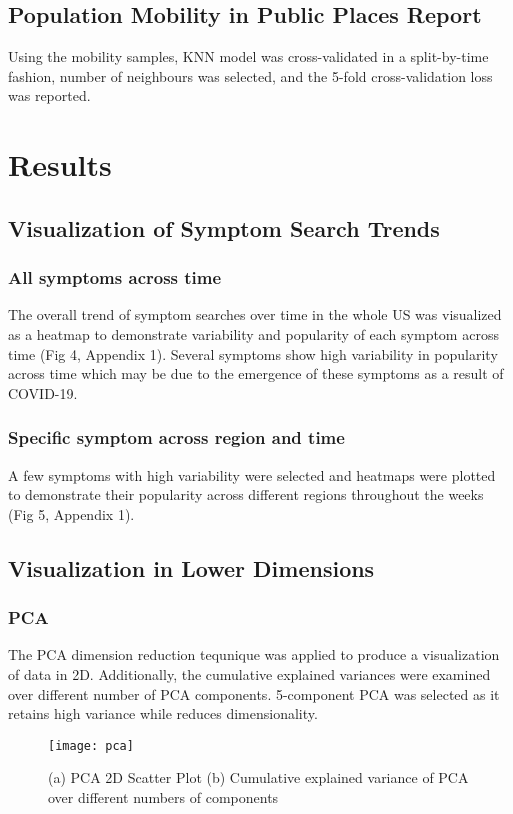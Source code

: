 \documentclass[12pt]{article}
\begin{document}
\subsection{Population Mobility in Public Places Report}
Using the mobility samples, KNN model was cross-validated in a split-by-time fashion, number of neighbours was selected, and the 5-fold cross-validation loss was reported.


\section{Results}

\subsection{Visualization of Symptom Search Trends}
\subsubsection{All symptoms across time}
The overall trend of symptom searches over time in the whole US was visualized as a heatmap to demonstrate variability and popularity of each symptom across time (Fig 4, Appendix 1). Several symptoms show high variability in popularity across time which may be due to the emergence of these symptoms as a result of COVID-19. 

\subsubsection{Specific symptom across region and time}
A few symptoms with high variability were selected and heatmaps were plotted to demonstrate their popularity across different regions throughout the weeks (Fig 5, Appendix 1).


\subsection{Visualization in Lower Dimensions}
\subsubsection{PCA}
The PCA dimension reduction tequnique was applied to produce a visualization of data in 2D. Additionally, the cumulative explained variances were examined over different number of PCA components. 5-component PCA was selected as it retains high variance while reduces dimensionality.

\begin{figure}[!htb]
    \centering
    \texttt{[image: pca]}
    \caption{(a) PCA 2D Scatter Plot (b) Cumulative explained variance of PCA over different numbers of components}
\end{figure}
\end{document}
